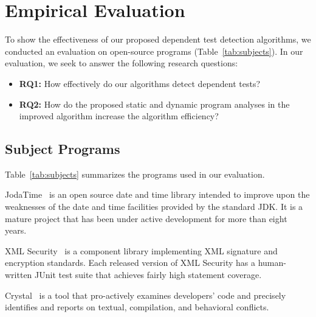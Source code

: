 \section{Empirical Evaluation}
\label{sec:evaluation}

To show the effectiveness of our proposed
dependent test detection algorithms, we conducted
an evaluation on  open-source programs (Table~\ref{tab:subjects}).
In our evaluation, we seek to answer the following research questions:

\begin{itemize}
\item \textbf{RQ1:} How effectively do our algorithms detect
dependent tests?
\item \textbf{RQ2:} How do the proposed static and dynamic program analyses
in the improved algorithm increase the algorithm efficiency?
\end{itemize}


\subsection{Subject Programs}




Table~\ref{tab:subjects} summarizes the programs used in our evaluation.

JodaTime~\cite{jodatime} is an open source
date and time library intended to improve upon the weaknesses of the
date and time facilities provided by the standard JDK.
It is a mature project that has been under active development
for more than eight years.

XML Security~\cite{xmlsecurity}
is a component library implementing XML signature and encryption
standards. Each released
version of XML Security has a human-written JUnit test suite that
achieves fairly high statement coverage.


Crystal~\cite{crystal} is a tool that
pro-actively examines developers' code and precisely identifies and reports on textual, compilation, and behavioral conflicts.




